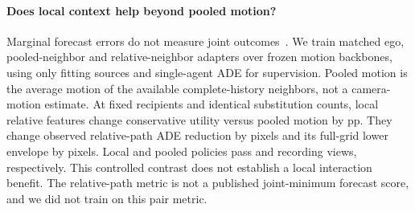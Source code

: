 \paragraph{Does local context help beyond pooled motion?}
Marginal forecast errors do not measure joint outcomes~\cite{jointmetrics}.
We train matched ego, pooled-neighbor and relative-neighbor
adapters over frozen motion backbones, using only fitting
sources and single-agent ADE for supervision. Pooled motion
is the average motion of the available complete-history
neighbors, not a camera-motion estimate. At fixed recipients
and identical substitution counts, local relative features
change conservative utility versus pooled motion by
\LocalVsPooledLower{} pp. They change observed relative-path
ADE reduction by \LocalPairObserved{} pixels and its
full-grid lower envelope by \LocalPairLower{} pixels.
Local and pooled policies pass \LocalPass{} and \PooledPass{}
recording views, respectively. This controlled contrast
does not establish a local interaction benefit. The
relative-path metric is not a published joint-minimum
forecast score, and we did not train on this pair metric.
